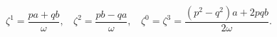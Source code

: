 \begin{equation}
\zeta^1 = \frac{pa + qb}{\omega},~~~~\zeta^2 = \frac{pb -qa}{\omega},~~~~
\zeta^0 = \zeta^3 = \frac{(p^2 - q^2)a + 2pqb}{2\omega}.
\label{555}
\end{equation}

